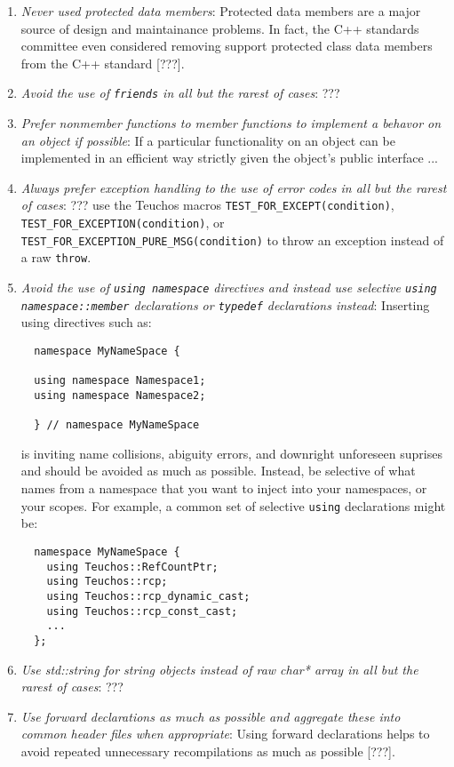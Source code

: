 \begin{enumerate}
{}\item\textit{Never used protected data members}: Protected data members are
a major source of design and maintainance problems.  In fact, the C++
standards committee even considered removing support protected class data
members from the C++ standard [???].

{}\item\textit{Avoid the use of {}\texttt{friends} in all but the rarest of
cases}: ???

{}\item\textit{Prefer nonmember functions to member functions to implement a
behavor on an object if possible}: If a particular functionality on an object
can be implemented in an efficient way strictly given the object's public interface ...

{}\item\textit{Always prefer exception handling to the use of error codes in
all but the rarest of cases}: ??? use the Teuchos macros
{}\texttt{TEST\-\_FOR\-\_EXCEPT(condition)},
{}\texttt{TEST\-\_FOR\-\_EXCEPTION(condition)}, or
{}\texttt{TEST\-\_FOR\-\_EXCEPTION\-\_PURE\-\_MSG(condition)} to throw an
exception instead of a raw {}\texttt{throw}.

{}\item\textit{Avoid the use of {}\texttt{using namespace} directives and
instead use selective {}\texttt{using namespace\-::member} declarations or
{}\texttt{typedef} declarations instead}: Inserting using directives such as:

\begin{verbatim}
  namespace MyNameSpace {

  using namespace Namespace1;
  using namespace Namespace2;

  } // namespace MyNameSpace

\end{verbatim}

is inviting name collisions, abiguity errors, and downright unforeseen
suprises and should be avoided as much as possible.  Instead, be selective of
what names from a namespace that you want to inject into your namespaces, or
your scopes.  For example, a common set of selective {}\texttt{using}
declarations might be:

\begin{verbatim}
  namespace MyNameSpace {
    using Teuchos::RefCountPtr;
    using Teuchos::rcp;
    using Teuchos::rcp_dynamic_cast;
    using Teuchos::rcp_const_cast;
    ...
  };
\end{verbatim}

{}\item\textit{Use std::string for string objects instead of raw char* array
in all but the rarest of cases}: ???

{}\item\textit{Use forward declarations as much as possible and aggregate
these into common header files when appropriate}: Using forward declarations
helps to avoid repeated unnecessary recompilations as much as possible [???].

\end{enumerate}

